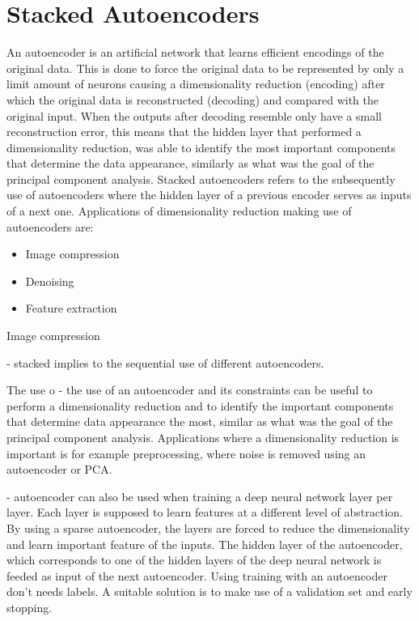 \documentclass[a4paper,10pt]{article}
\begin{document}
\section{Stacked Autoencoders}
An autoencoder is an artificial network that learns efficient  encodings of the original data. This is done to force the original data to be represented by only a limit amount of neurons causing a dimensionality reduction (encoding) after which the original data is reconstructed (decoding) and compared with the original input. When the outputs after decoding resemble only have a small reconstruction error, this means that the hidden layer that performed a dimensionality reduction, was able to identify the most important components that determine the data appearance, similarly as what was the goal of the principal component analysis. Stacked autoencoders refers to the subsequently use of autoencoders where the hidden layer of a previous encoder serves as inputs of a next one. Applications of dimensionality reduction making use of autoencoders are:
\begin{itemize}
	\item Image compression
	\item Denoising
	\item Feature extraction
\end{itemize}

Image compression 

- stacked implies to the sequential use of different autoencoders. 

The use o
- the use of an autoencoder and its constraints can be useful to perform a dimensionality reduction and to identify the important  components that determine data appearance the most, similar as what was the goal of the principal component analysis. Applications where a dimensionality reduction is important is for example preprocessing, where noise is removed using an autoencoder or PCA. 

- autoencoder can also be used when training a deep neural network layer per layer. Each layer is supposed to learn features at a different level of abstraction. By using a sparse autoencoder, the layers are forced to reduce the dimensionality and learn important feature of the inputs. The hidden layer of the autoencoder, which corresponds to one of the hidden layers of the deep neural network is feeded as input of the next autoencoder. Using training with an autoencoder don't needs labels. A suitable solution is to make use of a validation set and early stopping. 
\end{document}
